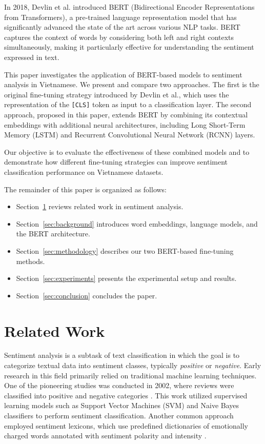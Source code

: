 \documentclass[11pt]{article}
\begin{document}
In 2018, Devlin et al. \cite{BERTJacob} introduced BERT (Bidirectional Encoder Representations from Transformers), a pre-trained language representation model that has significantly advanced the state of the art across various NLP tasks. BERT captures the context of words by considering both left and right contexts simultaneously, making it particularly effective for understanding the sentiment expressed in text.

This paper investigates the application of BERT-based models to sentiment analysis in Vietnamese. We present and compare two approaches. The first is the original fine-tuning strategy introduced by Devlin et al., which uses the representation of the \texttt{[CLS]} token as input to a classification layer. The second approach, proposed in this paper, extends BERT by combining its contextual embeddings with additional neural architectures, including Long Short-Term Memory (LSTM) and Recurrent Convolutional Neural Network (RCNN) layers.

Our objective is to evaluate the effectiveness of these combined models and to demonstrate how different fine-tuning strategies can improve sentiment classification performance on Vietnamese datasets.

The remainder of this paper is organized as follows:  
\begin{itemize}
    \item Section~\ref{sec:related_work} reviews related work in sentiment analysis.
    \item Section~\ref{sec:background} introduces word embeddings, language models, and the BERT architecture.
    \item Section~\ref{sec:methodology} describes our two BERT-based fine-tuning methods.
    \item Section~\ref{sec:experiments} presents the experimental setup and results.
    \item Section~\ref{sec:conclusion} concludes the paper.
\end{itemize}

\section{Related Work}
\label{sec:related_work}

Sentiment analysis is a subtask of text classification in which the goal is to categorize textual data into sentiment classes, typically \textit{positive} or \textit{negative}. Early research in this field primarily relied on traditional machine learning techniques. One of the pioneering studies was conducted in 2002, where reviews were classified into positive and negative categories \cite{pang-etal-2002-thumbs}. This work utilized supervised learning models such as Support Vector Machines (SVM) \cite{article} and Naive Bayes classifiers \cite{dey2016sentiment} to perform sentiment classification. Another common approach employed sentiment lexicons, which use predefined dictionaries of emotionally charged words annotated with sentiment polarity and intensity \cite{taboada-etal-2011-lexicon}.
\end{document}
